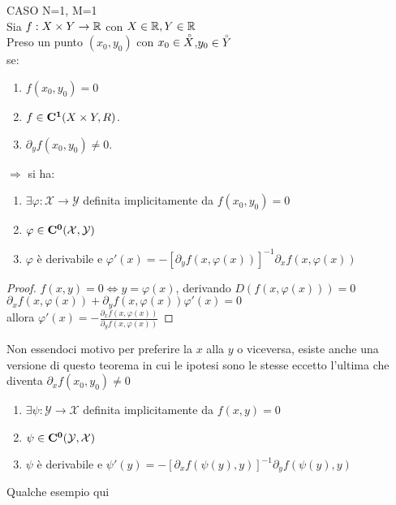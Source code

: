 \proposition CASO N=1, M=1\\
Sia $f:X\times Y\rightarrow \mathbb{R}$ con $X\in \mathbb{R}, Y\in \mathbb{R}$\\
Preso un punto $(x_0,y_0)$ con $x_0\in \accentset{\circ}{X}$,$y_0\in \accentset{\circ}{Y}$\\
se:
\begin{enumerate}
	\item $f(x_0,y_0)=0$
	\item $f\in \mathbf{C^{1}}(X\times Y,R)$.
	\item $\partial_yf(x_0,y_0)\ne 0$.
\end{enumerate}
$\Rightarrow $ si ha:\\
\begin{enumerate}
	\item $\exists \varphi: \mathcal{X}\rightarrow\mathcal{Y}$ definita implicitamente da $f(x_0,y_0)=0$
	\item $\varphi\in \mathbf{C^{0}}(\mathcal{X},\mathcal{Y})$
	\item $\varphi$ è derivabile e $\varphi'(x)=-[\partial_yf(x,\varphi(x))]^{-1}\partial_xf(x,\varphi(x))$
\end{enumerate}
\begin{proof}
	$f(x,y)=0\Leftrightarrow y=\varphi(x)$, derivando $D(f(x,\varphi(x)))=0$\\
	$\partial_xf(x,\varphi(x))+\partial_yf(x,\varphi(x))\varphi'(x)=0$\\
	allora $\varphi'(x) = -\frac{\partial_xf(x,\varphi(x))}{\partial_yf(x,\varphi(x))}$
\end{proof}
\observation Non essendoci motivo per preferire la $x$ alla $y$ o viceversa, esiste anche una versione di questo teorema  in  cui le ipotesi sono le stesse eccetto l'ultima che diventa $\partial_xf(x_0,y_0)\ne 0$
\begin{enumerate}
	\item $\exists \psi: \mathcal{Y}\rightarrow\mathcal{X}$ definita implicitamente da $f(x,y)=0$
	\item $\psi\in \mathbf{C^{0}}(\mathcal{Y},\mathcal{X})$
	\item $\psi$ è derivabile e $\psi'(y)=-[\partial_xf(\psi(y),y)]^{-1}\partial_yf(\psi(y),y)$
\end{enumerate}
Qualche esempio qui\\
